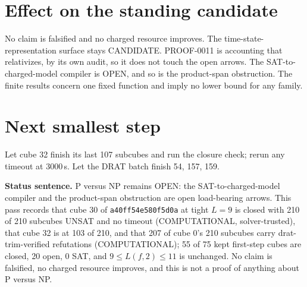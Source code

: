 \documentclass[11pt]{article}
\begin{document}
\section*{Effect on the standing candidate}
No claim is falsified and no charged resource improves. The time-state-representation surface stays CANDIDATE. PROOF-0011 is accounting that relativizes, by its own audit, so it does not touch the open arrows. The SAT-to-charged-model compiler is OPEN, and so is the product-span obstruction. The finite results concern one fixed function and imply no lower bound for any family.

\section*{Next smallest step}
Let cube 32 finish its last 107 subcubes and run the closure check; rerun any timeout at 3000\,s. Let the DRAT batch finish 54, 157, 159.

\bigskip
\noindent\textbf{Status sentence.} P versus NP remains OPEN: the SAT-to-charged-model compiler and the product-span obstruction are open load-bearing arrows. This pass records that cube 30 of \texttt{a40ff54e580f5d0a} at tight $L=9$ is closed with 210 of 210 subcubes UNSAT and no timeout (COMPUTATIONAL, solver-trusted), that cube 32 is at 103 of 210, and that 207 of cube 0's 210 subcubes carry drat-trim-verified refutations (COMPUTATIONAL); 55 of 75 kept first-step cubes are closed, 20 open, 0 SAT, and $9\le L(f,2)\le 11$ is unchanged. No claim is falsified, no charged resource improves, and this is not a proof of anything about P versus NP.
\end{document}
